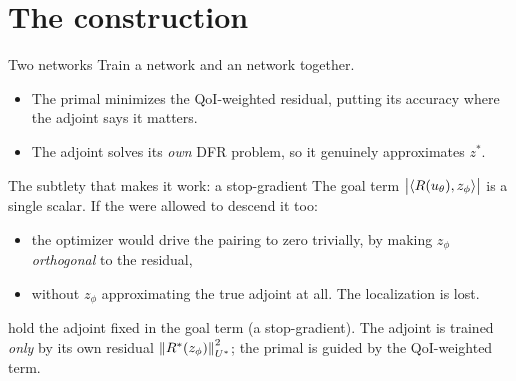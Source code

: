 \documentclass[11pt,aspectratio=169]{beamer}
\begin{document}
\section{The construction}

\begin{frame}{Two networks}
  Train a  network and an  network together.
  \medskip
  \begin{center}
  \end{center}
  \medskip
  \begin{itemize}\itemsep0.4em
    \item The primal minimizes the QoI-weighted residual, putting its accuracy
          where the adjoint says it matters.
    \item The adjoint solves its \emph{own} DFR problem, so it genuinely
          approximates $z^*$.
  \end{itemize}
\end{frame}

\begin{frame}{The subtlety that makes it work: a stop-gradient}
  The goal term $\bigl|\left\langle R(u_\theta), z_\phi \right\rangle\bigr|$ is a single scalar.
  If the  were allowed to descend it too:
  \medskip
  \begin{itemize}\itemsep0.5em
    \item[\alert{$\times$}] the optimizer would drive the pairing to zero
          trivially, by making $z_\phi$ \emph{orthogonal} to the residual,
    \item[\alert{$\times$}] without $z_\phi$ approximating the true adjoint at
          all. The localization is lost.
  \end{itemize}
  \medskip
   hold the adjoint fixed in the goal term (a stop-gradient). The
  adjoint is trained \emph{only} by its own residual $\left\|R^{*}(z_\phi)\right\|_{U^*}^2$;
  the primal is guided by the QoI-weighted term.
\end{frame}
\end{document}
